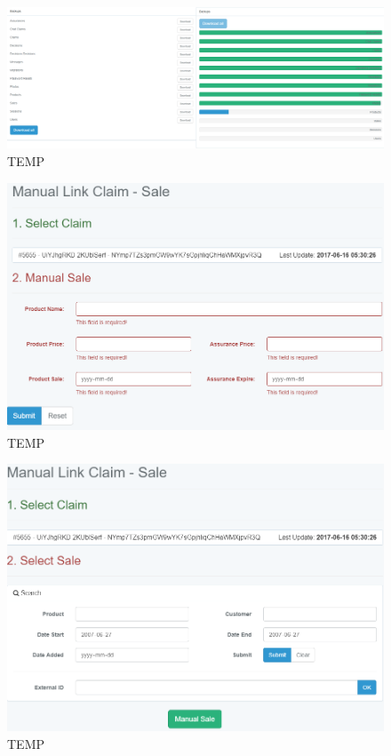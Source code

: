 \begin{figure}
		\includegraphics[width=\linewidth]{../imagini/backups.png}
		\caption{TEMP}
		\label{fig:TEMP}
	\end{figure}
	\begin{figure}
		\includegraphics[width=\linewidth]{../imagini/claims_manual_sale.png}
		\caption{TEMP}
		\label{fig:TEMP}
	\end{figure}
	\begin{figure}
		\includegraphics[width=\linewidth]{../imagini/claims_match_sale.png}
		\caption{TEMP}
		\label{fig:TEMP}
	\end{figure}
